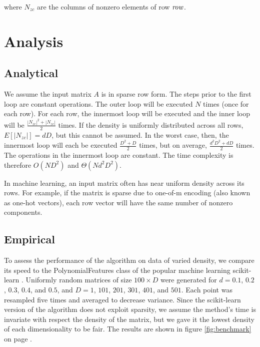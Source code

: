 \documentclass[11pt,twocolumn]{article}
\begin{document}
where $N_{zc}$ are the columns of nonzero elements of row $\id{row}$.

\section{Analysis}

\subsection{Analytical}
We assume the input matrix $A$ is in sparse row form. The steps prior to the first loop are
constant operations. The outer loop will be executed $N$ times (once for each row). For each row, 
the innermost loop will be executed and the inner loop will be $\frac{|N_{zc}|^2+|N_{zc}|}{2}$ times.
If the density is uniformly distributed across all rows, $E[|N_{zc}|] = dD$, but this cannot be assumed. In the worst case,
then, the innermost loop will each be executed $\frac{D^2+D}{2}$ times, but on average, $\frac{d^2D^2+dD}{2}$ times.
The operations in the innermost loop are constant. The time complexity is therefore $O(ND^2)$ and $\Theta(Nd^2D^2)$.

In machine learning, an input matrix often has near uniform density across its rows.
For example, if the matrix is sparse due to one-of-m encoding (also known as one-hot vectors), each row vector will
have the same number of nonzero components.

\subsection{Empirical}
To assess the performance of the algorithm on data of varied density, we compare its speed
to the PolynomialFeatures class of the popular machine learning scikit-learn \cite{scikit-learn}.
Uniformly random matrices of size $100 \times D$ were generated for $d=0.1$, $0.2$, $0.3$, $0.4$, and $0.5$, and 
$D=1$, $101$, $201$, $301$, $401$, and $501$. Each point was resampled five times and averaged to decrease variance. Since the scikit-learn version of the algorithm
does not exploit sparsity, we assume the method's time is invariate with respect the density of the matrix, but
we gave it the lowest density of each dimensionality to be fair. The results are shown in figure \eqref{fig:benchmark} on page \pageref{fig:benchmark}.
\end{document}
